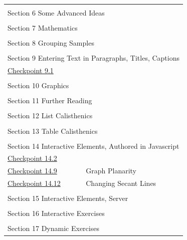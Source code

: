 \documentclass{amsart}
\theoremstyle{plain}%
\theoremstyle{definition}%
\theoremstyle{remark}%
\numberwithin{equation}{section}
\begin{document}
\begin{appendices}
\begin{longtable}[l]{ll}
\multicolumn{2}{l}{\null}\\[1.5ex] \multicolumn{2}{l}{\large Section 6 Some Advanced Ideas}\\[0.5ex]
\multicolumn{2}{l}{\null}\\[1.5ex] \multicolumn{2}{l}{\large Section 7 Mathematics}\\[0.5ex]
\multicolumn{2}{l}{\null}\\[1.5ex] \multicolumn{2}{l}{\large Section 8 Grouping Samples}\\[0.5ex]
\multicolumn{2}{l}{\null}\\[1.5ex] \multicolumn{2}{l}{\large Section 9 Entering Text in Paragraphs, Titles, Captions}\\[0.5ex]
\hyperref[subsection-xml-escape-7]{Checkpoint 9.1}& \\
\multicolumn{2}{l}{\null}\\[1.5ex] \multicolumn{2}{l}{\large Section 10 Graphics}\\[0.5ex]
\multicolumn{2}{l}{\null}\\[1.5ex] \multicolumn{2}{l}{\large Section 11 Further Reading}\\[0.5ex]
\multicolumn{2}{l}{\null}\\[1.5ex] \multicolumn{2}{l}{\large Section 12 List Calisthenics}\\[0.5ex]
\multicolumn{2}{l}{\null}\\[1.5ex] \multicolumn{2}{l}{\large Section 13 Table Calisthenics}\\[0.5ex]
\multicolumn{2}{l}{\null}\\[1.5ex] \multicolumn{2}{l}{\large Section 14 Interactive Elements, Authored in Javascript}\\[0.5ex]
\hyperref[interactive-html5-canvas-5]{Checkpoint 14.2}& \\
\hyperref[section-interactive-authored-8-10]{Checkpoint 14.9}& Graph Planarity\\
\hyperref[svg-interactives-5]{Checkpoint 14.12}& Changing Secant Lines\\
\multicolumn{2}{l}{\null}\\[1.5ex] \multicolumn{2}{l}{\large Section 15 Interactive Elements, Server}\\[0.5ex]
\multicolumn{2}{l}{\null}\\[1.5ex] \multicolumn{2}{l}{\large Section 16 Interactive Exercises}\\[0.5ex]
\multicolumn{2}{l}{\null}\\[1.5ex] \multicolumn{2}{l}{\large Section 17 Dynamic Exercises}\\[0.5ex]

\end{longtable}
\end{appendices}
\end{document}
